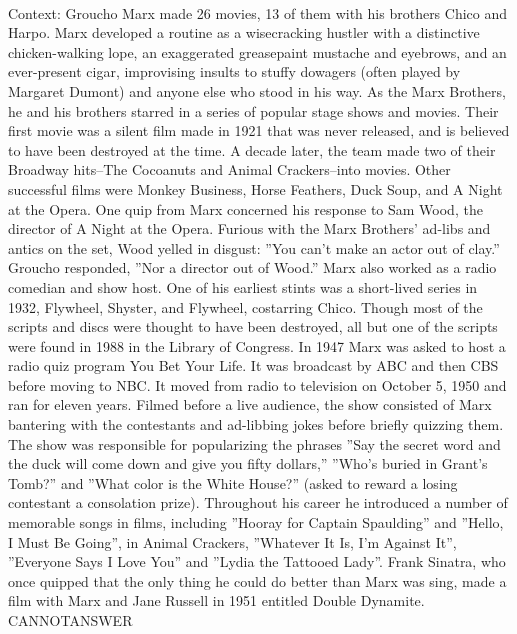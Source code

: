 \documentclass[11pt,a4paper, onecolumn]{article}
\begin{document}
\\ Context: Groucho Marx made 26 movies, 13 of them with his brothers Chico and Harpo. Marx developed a routine as a wisecracking hustler with a distinctive chicken-walking lope, an exaggerated greasepaint mustache and eyebrows, and an ever-present cigar, improvising insults to stuffy dowagers (often played by Margaret Dumont) and anyone else who stood in his way. As the Marx Brothers, he and his brothers starred in a series of popular stage shows and movies. Their first movie was a silent film made in 1921 that was never released, and is believed to have been destroyed at the time. A decade later, the team made two of their Broadway hits--The Cocoanuts and Animal Crackers--into movies. Other successful films were Monkey Business, Horse Feathers, Duck Soup, and A Night at the Opera. One quip from Marx concerned his response to Sam Wood, the director of A Night at the Opera. Furious with the Marx Brothers' ad-libs and antics on the set, Wood yelled in disgust: ''You can't make an actor out of clay.'' Groucho responded, ''Nor a director out of Wood.'' Marx also worked as a radio comedian and show host. One of his earliest stints was a short-lived series in 1932, Flywheel, Shyster, and Flywheel, costarring Chico. Though most of the scripts and discs were thought to have been destroyed, all but one of the scripts were found in 1988 in the Library of Congress. In 1947 Marx was asked to host a radio quiz program You Bet Your Life. It was broadcast by ABC and then CBS before moving to NBC. It moved from radio to television on October 5, 1950 and ran for eleven years. Filmed before a live audience, the show consisted of Marx bantering with the contestants and ad-libbing jokes before briefly quizzing them. The show was responsible for popularizing the phrases ''Say the secret word and the duck will come down and give you fifty dollars,'' ''Who's buried in Grant's Tomb?'' and ''What color is the White House?'' (asked to reward a losing contestant a consolation prize). Throughout his career he introduced a number of memorable songs in films, including ''Hooray for Captain Spaulding'' and ''Hello, I Must Be Going'', in Animal Crackers, ''Whatever It Is, I'm Against It'', ''Everyone Says I Love You'' and ''Lydia the Tattooed Lady''. Frank Sinatra, who once quipped that the only thing he could do better than Marx was sing, made a film with Marx and Jane Russell in 1951 entitled Double Dynamite. CANNOTANSWER
\end{document}
